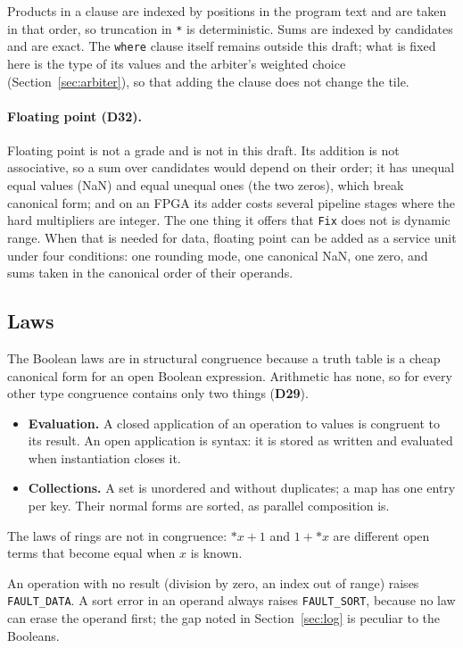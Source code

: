 \documentclass[10.5pt,a4paper]{extarticle}
\newcommand{\kw}[1]{\texttt{#1}}
\newcommand{\drp}[1]{{*}#1}
\newcommand{\dec}[1]{\textbf{D#1}}
\theoremstyle{definition}
\theoremstyle{remark}
\begin{document}
\medskip\noindent
Products in a clause are indexed by positions in the program text and are
taken in that order, so truncation in \kw{*} is deterministic. Sums are
indexed by candidates and are exact. The \kw{where} clause itself remains
outside this draft; what is fixed here is the type of its values and the
arbiter's weighted choice (Section~\ref{sec:arbiter}), so that adding the
clause does not change the tile.

\paragraph{Floating point (\dec{32}).} Floating point is not a grade and is
not in this draft. Its addition is not associative, so a sum over candidates
would depend on their order; it has unequal equal values (NaN) and equal
unequal ones (the two zeros), which break canonical form; and on an FPGA its
adder costs several pipeline stages where the hard multipliers are integer.
The one thing it offers that \kw{Fix} does not is dynamic range. When that
is needed for data, floating point can be added as a service unit under
four conditions: one rounding mode, one canonical NaN, one zero, and sums
taken in the canonical order of their operands.

\subsection{Laws}\label{sec:datalaws}

The Boolean laws are in structural congruence because a truth table is a
cheap canonical form for an open Boolean expression. Arithmetic has none, so
for every other type congruence contains only two things (\dec{29}).
\begin{itemize}
\item \textbf{Evaluation.} A closed application of an operation to values is
congruent to its result. An open application is syntax: it is stored as
written and evaluated when instantiation closes it.
\item \textbf{Collections.} A set is unordered and without duplicates; a map
has one entry per key. Their normal forms are sorted, as parallel
composition is.
\end{itemize}
The laws of rings are not in congruence: $\drp{x} + 1$ and $1 + \drp{x}$
are different open terms that become equal when $x$ is known.

An operation with no result (division by zero, an index out of range) raises
\kw{FAULT\_DATA}. A sort error in an operand always raises \kw{FAULT\_SORT},
because no law can erase the operand first; the gap noted in
Section~\ref{sec:log} is peculiar to the Booleans.
\end{document}
